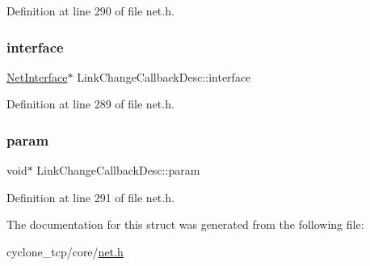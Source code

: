 Definition at line 290 of file net.\+h.

\mbox{\label{structLinkChangeCallbackDesc_adc36a3ad331a45c3bde009cc476bd559}} 
\subsubsection{\texorpdfstring{interface}{interface}}
{\footnotesize\ttfamily \hyperlink{net_8h_a2234db8911a1148c9159979d8f5e0d6b}{Net\+Interface}$\ast$ Link\+Change\+Callback\+Desc\+::interface}



Definition at line 289 of file net.\+h.

\mbox{\label{structLinkChangeCallbackDesc_a109ef09876fabae6dad4286d1a105a00}} 
\subsubsection{\texorpdfstring{param}{param}}
{\footnotesize\ttfamily void$\ast$ Link\+Change\+Callback\+Desc\+::param}



Definition at line 291 of file net.\+h.



The documentation for this struct was generated from the following file\+:\begin{DoxyCompactItemize}
\item 
cyclone\+\_\+tcp/core/\hyperlink{net_8h}{net.\+h}\end{DoxyCompactItemize}
